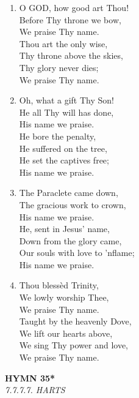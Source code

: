 \documentclass[11pt,a4paper]{article}
\begin{document}
\begin{enumerate}
    \item O GOD, how good art Thou! \\
        Before Thy throne we bow, \\
        We praise Thy name. \\
        Thou art the only wise, \\
        Thy throne above the skies, \\
        Thy glory never dies; \\
        We praise Thy name.

    \item Oh, what a gift Thy Son! \\
        He all Thy will has done, \\
        His name we praise. \\
        He bore the penalty, \\
        He suffered on the tree, \\
        He set the captives free; \\
        His name we praise.

    \item The Paraclete came down, \\
        The gracious work to crown, \\
        His name we praise. \\
        He, sent in Jesus' name, \\
        Down from the glory came, \\
        Our souls with love to 'nflame; \\
        His name we praise.

    \item Thou bless\`ed Trinity, \\
        We lowly worship Thee, \\
        We praise Thy name. \\
        Taught by the heavenly Dove, \\
        We lift our hearts above, \\
        We sing Thy power and love, \\
        We praise Thy name.

\end{enumerate}

\newpage
\begin{center}
    {\Large \textbf{HYMN 35*}}
    \\
    \textit{7.7.7.7. HARTS}
\end{center}
\vspace{1em}
\end{document}
